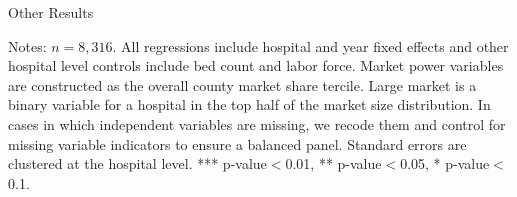 \documentclass[12pt]{article}
\begin{document}
\newpage
{}
\setlength{\captionmargin}{.5 \textwidth} \addtolength{\captionmargin}{-.5\wd\gfxbox}
\begin{table}[!h]
\centering
\caption{Other Results}
\label{tab:other_results}
\usebox{\gfxbox}
\par
\begin{minipage}{\wd\gfxbox}
\footnotesize
Notes: $n=8,316$.  All regressions include hospital and year fixed effects and other hospital level controls include bed count and labor force.  Market power variables are constructed as the overall county market share tercile.  Large market is a binary variable for a hospital in the top half of the market size distribution.  In cases in which independent variables are missing, we recode them and control for missing variable indicators to ensure a balanced panel.  Standard errors are clustered at the hospital level.  *** p-value$<$0.01, ** p-value$<$0.05, * p-value$<$0.1.
\end{minipage}
\end{table}
\end{document}
